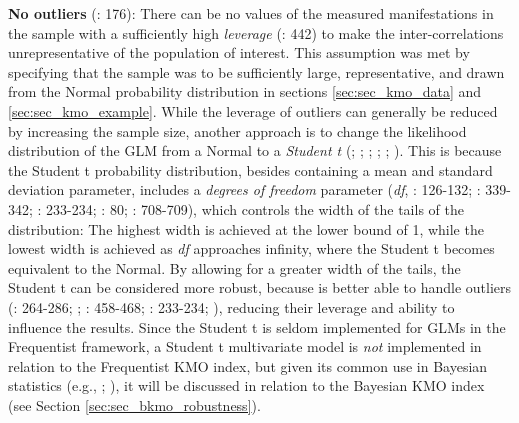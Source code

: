 \documentclass[
  10pt,
  a4paper,
  twoside]{article}
\begin{document}
\textbf{No outliers} (: 176): There can be no values of the measured manifestations in the sample with a sufficiently high \emph{leverage} (: 442) to make the inter-correlations unrepresentative of the population of interest. This assumption was met by specifying that the sample was to be sufficiently large, representative, and drawn from the Normal probability distribution in sections \ref{sec:sec_kmo_data} and \ref{sec:sec_kmo_example}. While the leverage of outliers can generally be reduced by increasing the sample size, another approach is to change the likelihood distribution of the GLM from a Normal to a \emph{Student t} (; ; ; ; ; ). This is because the Student t probability distribution, besides containing a mean and standard deviation parameter, includes a \emph{degrees of freedom} parameter (\emph{df}, : 126-132; : 339-342; : 233-234; : 80; : 708-709), which controls the width of the tails of the distribution: The highest width is achieved at the lower bound of 1, while the lowest width is achieved as \emph{df} approaches infinity, where the Student t becomes equivalent to the Normal. By allowing for a greater width of the tails, the Student t can be considered more robust, because is better able to handle outliers (: 264-286; ; : 458-468; : 233-234; ), reducing their leverage and ability to influence the results. Since the Student t is seldom implemented for GLMs in the Frequentist framework, a Student t multivariate model is \emph{not} implemented in relation to the Frequentist KMO index, but given its common use in Bayesian statistics (e.g., ; ), it will be discussed in relation to the Bayesian KMO index (see Section \ref{sec:sec_bkmo_robustness}).
\end{document}
